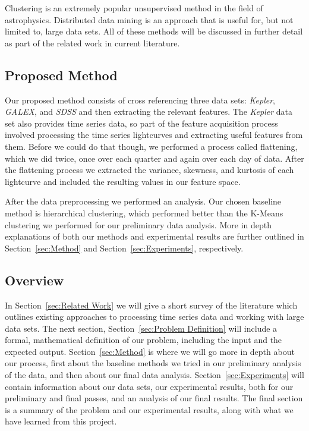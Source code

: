 \documentclass[12pt]{article}
\begin{document}
Clustering is an extremely popular unsupervised method in the field of astrophysics.
Distributed data mining is an approach that is useful for, but not limited to, large data sets. 
All of these methods will be discussed in further detail as part of the related work in current literature.


\subsection{Proposed Method} %
\label{sub:Proposed Method}
Our proposed method consists of cross referencing three data sets: \textit{Kepler}, \textit{GALEX}, and \textit{SDSS} and then extracting the relevant features.
The \textit{Kepler} data set also provides time series data, so part of the feature acquisition process involved processing the time series lightcurves and extracting useful features from them.
Before we could do that though, we performed a process called flattening, which we did twice, once over each quarter and again over each day of data.
After the flattening process we extracted the variance, skewness, and kurtosis of each lightcurve and included the resulting values in our feature space.

After the data preprocessing we performed an analysis.
Our chosen baseline method is hierarchical clustering, which performed better than the K-Means clustering we performed for our preliminary data analysis. 
More in depth explanations of both our methods and experimental results are further outlined in Section~\ref{sec:Method} and Section~\ref{sec:Experiments}, respectively.


\subsection{Overview} %
\label{sub:Overview}
In Section~\ref{sec:Related Work} we will give a short survey of the literature which outlines existing approaches to processing time series data and working with large data sets.
The next section, Section~\ref{sec:Problem Definition} will include a formal, mathematical definition of our problem, including the input and the expected output.
Section~\ref{sec:Method} is where we will go more in depth about our process, first about the baseline methods we tried in our preliminary analysis of the data, and then about our final data analysis.
Section~\ref{sec:Experiments} will contain information about our data sets, our experimental results, both for our preliminary and final passes, and an analysis of our final results.
The final section is a summary of the problem and our experimental results, along with what we have learned from this project.
\end{document}
